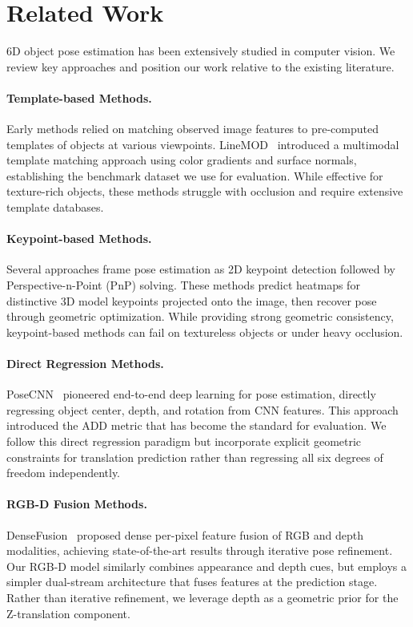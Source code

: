 \section{Related Work}
\label{sec:related}

6D object pose estimation has been extensively studied in computer vision. We review key approaches and position our work relative to the existing literature.

\paragraph{Template-based Methods.}
Early methods relied on matching observed image features to pre-computed templates of objects at various viewpoints. LineMOD~\cite{hinterstoisser2012model} introduced a multimodal template matching approach using color gradients and surface normals, establishing the benchmark dataset we use for evaluation. While effective for texture-rich objects, these methods struggle with occlusion and require extensive template databases.

\paragraph{Keypoint-based Methods.}
Several approaches frame pose estimation as 2D keypoint detection followed by Perspective-n-Point (PnP) solving. These methods predict heatmaps for distinctive 3D model keypoints projected onto the image, then recover pose through geometric optimization. While providing strong geometric consistency, keypoint-based methods can fail on textureless objects or under heavy occlusion.

\paragraph{Direct Regression Methods.}
PoseCNN~\cite{xiang2018posecnn} pioneered end-to-end deep learning for pose estimation, directly regressing object center, depth, and rotation from CNN features. This approach introduced the ADD metric that has become the standard for evaluation. We follow this direct regression paradigm but incorporate explicit geometric constraints for translation prediction rather than regressing all six degrees of freedom independently.

\paragraph{RGB-D Fusion Methods.}
DenseFusion~\cite{wang2019densefusion} proposed dense per-pixel feature fusion of RGB and depth modalities, achieving state-of-the-art results through iterative pose refinement. Our RGB-D model similarly combines appearance and depth cues, but employs a simpler dual-stream architecture that fuses features at the prediction stage. Rather than iterative refinement, we leverage depth as a geometric prior for the Z-translation component.

